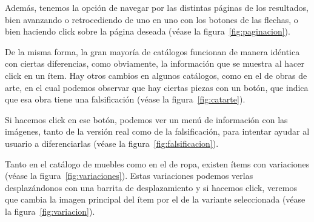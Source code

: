 Además, tenemos la opción de navegar por las distintas páginas de los resultados, bien avanzando o retrocediendo de uno en uno con los botones de las flechas, o bien haciendo click sobre la página deseada {(v\'ease la figura~\ref{fig:paginacion})}.\\


\clearpage

De la misma forma, la gran mayoría de catálogos funcionan de manera idéntica con ciertas diferencias, como obviamente, la información que se muestra al hacer click en un ítem. Hay otros cambios en algunos catálogos, como en el de obras de arte, en el cual podemos observar que hay ciertas piezas con un botón, que indica que esa obra tiene una falsificación {(v\'ease la figura~\ref{fig:catarte})}.\\


Si hacemos click en ese botón, podemos ver un menú de información con las imágenes, tanto de la versión real como de la falsificación, para intentar ayudar al usuario a diferenciarlas {(v\'ease la figura~\ref{fig:falsificacion})}.\\


\clearpage

Tanto en el catálogo de muebles como en el de ropa, existen ítems con variaciones {(v\'ease la figura~\ref{fig:variaciones})}. Estas variaciones podemos verlas desplazándonos con una barrita de desplazamiento y si hacemos click, veremos que cambia la imagen principal del ítem por el de la variante seleccionada {(v\'ease la figura~\ref{fig:variacion})}.\\

